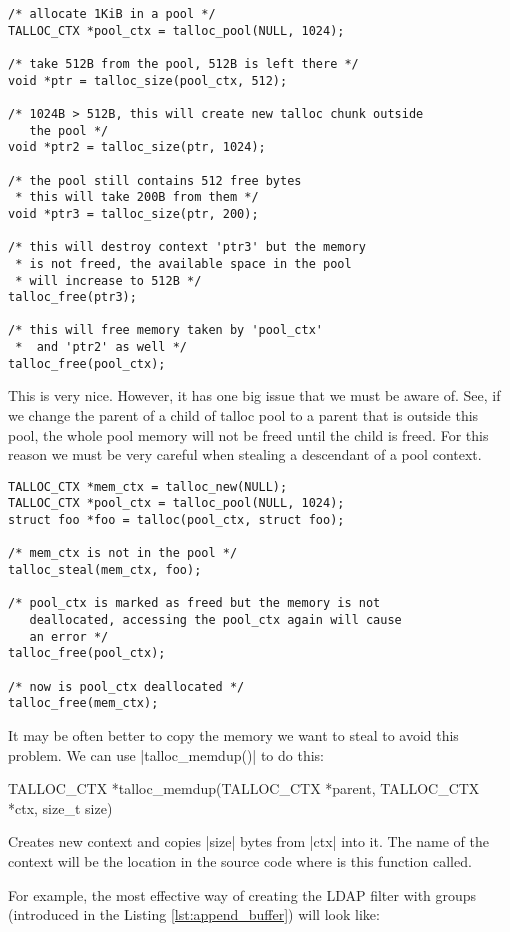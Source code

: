 \begin{lstlisting}[caption={Talloc pool},label=lst:talloc_pool,
morekeywords={talloc_pool}]
/* allocate 1KiB in a pool */
TALLOC_CTX *pool_ctx = talloc_pool(NULL, 1024);

/* take 512B from the pool, 512B is left there */
void *ptr = talloc_size(pool_ctx, 512);

/* 1024B > 512B, this will create new talloc chunk outside
   the pool */
void *ptr2 = talloc_size(ptr, 1024);

/* the pool still contains 512 free bytes
 * this will take 200B from them */
void *ptr3 = talloc_size(ptr, 200);

/* this will destroy context 'ptr3' but the memory
 * is not freed, the available space in the pool
 * will increase to 512B */
talloc_free(ptr3);

/* this will free memory taken by 'pool_ctx'
 *  and 'ptr2' as well */
talloc_free(pool_ctx);
\end{lstlisting}

\noindent
This is very nice. However, it has one big issue that we must be aware of. See,
if we change the parent of a child of talloc pool to a parent that is outside
this pool, the whole pool memory will not be freed until the child is freed.
For this reason we must be very careful when stealing a descendant of a pool
context.

\begin{lstlisting}[caption={Stealing from pool context},
morekeywords={talloc_pool,talloc_steal,talloc_free}]
TALLOC_CTX *mem_ctx = talloc_new(NULL);
TALLOC_CTX *pool_ctx = talloc_pool(NULL, 1024);
struct foo *foo = talloc(pool_ctx, struct foo);

/* mem_ctx is not in the pool */
talloc_steal(mem_ctx, foo);

/* pool_ctx is marked as freed but the memory is not
   deallocated, accessing the pool_ctx again will cause
   an error */
talloc_free(pool_ctx);

/* now is pool_ctx deallocated */
talloc_free(mem_ctx);
\end{lstlisting}

\noindent
It may be often better to copy the memory we want to steal to avoid this
problem. We can use |talloc_memdup()| to do this:

\begin{funcproto}
TALLOC_CTX *talloc_memdup(TALLOC_CTX *parent,
                          TALLOC_CTX *ctx, size_t size)
\end{funcproto}
\begin{funcdesc}
Creates new context and copies |size| bytes from |ctx| into it. The name of the
context will be the location in the source code where is this function called.
\end{funcdesc}
\funclistend
For example, the most effective way of creating the LDAP filter with groups
(introduced in the Listing \ref{lst:append_buffer}) will look like:

